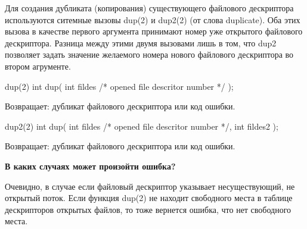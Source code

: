 Для создания дубликата (копирования) существующего файлового дескриптора используются ситемные вызовы dup(2) и dup2(2) (от слова duplicate). Оба этих вызова в качестве первого аргумента принимают номер уже открытого файлового дескриптора. Разница между этими двумя вызовами лишь в том, что dup2 позволяет задать значение желаемого номера нового файлового дескриптора во втором агрументе.

\begin{CCode}{dup(2)}
	int dup( 
		int fildes /* opened file descritor number */
	); \end{CCode}
Возвращает: дубликат файлового дескриптора или код ошибки.

\begin{CCode}{dup2(2)}
	int dup( 
		int fildes /* opened file descritor number */, 
		int fildes2 
	); \end{CCode}
Возвращает: дубликат файлового дескриптора или код ошибки.

\textbf{В каких случаях может произойти ошибка?}

Очевидно, в случае если файловый дескриптор указывает несуществующий, не открытый поток. Если функция dup(2) не находит свободного места в таблице дескрипторов открытых файлов, то тоже вернется ошибка, что нет свободного места. 
